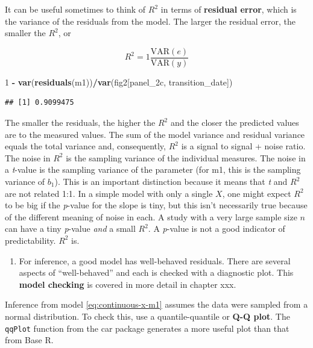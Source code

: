 \documentclass[]{book}
\newenvironment{Shaded}{\begin{snugshade}}{\end{snugshade}}
\newcommand{\DecValTok}[1]{\textcolor[rgb]{0.00,0.00,0.81}{#1}}
\newcommand{\KeywordTok}[1]{\textcolor[rgb]{0.13,0.29,0.53}{\textbf{#1}}}
\newcommand{\NormalTok}[1]{#1}
\newcommand{\OperatorTok}[1]{\textcolor[rgb]{0.81,0.36,0.00}{\textbf{#1}}}
\newcommand{\StringTok}[1]{\textcolor[rgb]{0.31,0.60,0.02}{#1}}
\providecommand{\tightlist}{%
  \setlength{\itemsep}{0pt}\setlength{\parskip}{0pt}}
\begin{document}
It can be useful sometimes to think of \(R^2\) in terms of \textbf{residual error}, which is the variance of the residuals from the model. The larger the residual error, the smaller the \(R^2\), or

\begin{equation}
R^2 = 1 \frac{\mathrm{VAR}(e)}{\mathrm{VAR}(y)}
\end{equation}

\begin{Shaded}
\begin{Highlighting}[]
\DecValTok{1} \OperatorTok{-}\StringTok{ }\KeywordTok{var}\NormalTok{(}\KeywordTok{residuals}\NormalTok{(m1))}\OperatorTok{/}\KeywordTok{var}\NormalTok{(fig2[panel_2c, transition_date])}
\end{Highlighting}
\end{Shaded}

\begin{verbatim}
## [1] 0.9099475
\end{verbatim}

The smaller the residuals, the higher the \(R^2\) and the closer the predicted values are to the measured values. The sum of the model variance and residual variance equals the total variance and, consequently, \(R^2\) is a signal to signal + noise ratio. The noise in \(R^2\) is the sampling variance of the individual measures. The noise in a \emph{t}-value is the sampling variance of the parameter (for m1, this is the sampling variance of \(b_1\)). This is an important distinction because it means that \emph{t} and \(R^2\) are not related 1:1. In a simple model with only a single \(X\), one might expect \(R^2\) to be big if the \emph{p}-value for the slope is tiny, but this isn't necessarily true because of the different meaning of noise in each. A study with a very large sample size \(n\) can have a tiny \emph{p}-value \emph{and} a small \(R^2\). A \emph{p}-value is not a good indicator of predictability. \(R^2\) is.

\begin{enumerate}
\def\labelenumi{\arabic{enumi}.}
\setcounter{enumi}{1}
\tightlist
\item
  For inference, a good model has well-behaved residuals. There are several aspects of ``well-behaved'' and each is checked with a diagnostic plot. This \textbf{model checking} is covered in more detail in chapter xxx.
\end{enumerate}

Inference from model \eqref{eq:continuous-x-m1} assumes the data were sampled from a normal distribution. To check this, use a quantile-quantile or \textbf{Q-Q plot}. The \texttt{qqPlot} function from the car package generates a more useful plot than that from Base R.
\end{document}
